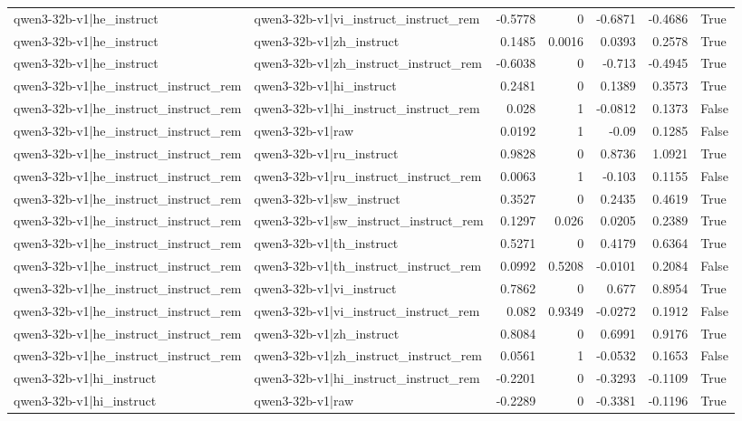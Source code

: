 \begin{table}
\begin{tabular}{l l r r r r l}
qwen3-32b-v1|he_instruct & qwen3-32b-v1|vi_instruct_instruct_rem & -0.5778 & 0 & -0.6871 & -0.4686 & True \\
qwen3-32b-v1|he_instruct & qwen3-32b-v1|zh_instruct & 0.1485 & 0.0016 & 0.0393 & 0.2578 & True \\
qwen3-32b-v1|he_instruct & qwen3-32b-v1|zh_instruct_instruct_rem & -0.6038 & 0 & -0.713 & -0.4945 & True \\
qwen3-32b-v1|he_instruct_instruct_rem & qwen3-32b-v1|hi_instruct & 0.2481 & 0 & 0.1389 & 0.3573 & True \\
qwen3-32b-v1|he_instruct_instruct_rem & qwen3-32b-v1|hi_instruct_instruct_rem & 0.028 & 1 & -0.0812 & 0.1373 & False \\
qwen3-32b-v1|he_instruct_instruct_rem & qwen3-32b-v1|raw & 0.0192 & 1 & -0.09 & 0.1285 & False \\
qwen3-32b-v1|he_instruct_instruct_rem & qwen3-32b-v1|ru_instruct & 0.9828 & 0 & 0.8736 & 1.0921 & True \\
qwen3-32b-v1|he_instruct_instruct_rem & qwen3-32b-v1|ru_instruct_instruct_rem & 0.0063 & 1 & -0.103 & 0.1155 & False \\
qwen3-32b-v1|he_instruct_instruct_rem & qwen3-32b-v1|sw_instruct & 0.3527 & 0 & 0.2435 & 0.4619 & True \\
qwen3-32b-v1|he_instruct_instruct_rem & qwen3-32b-v1|sw_instruct_instruct_rem & 0.1297 & 0.026 & 0.0205 & 0.2389 & True \\
qwen3-32b-v1|he_instruct_instruct_rem & qwen3-32b-v1|th_instruct & 0.5271 & 0 & 0.4179 & 0.6364 & True \\
qwen3-32b-v1|he_instruct_instruct_rem & qwen3-32b-v1|th_instruct_instruct_rem & 0.0992 & 0.5208 & -0.0101 & 0.2084 & False \\
qwen3-32b-v1|he_instruct_instruct_rem & qwen3-32b-v1|vi_instruct & 0.7862 & 0 & 0.677 & 0.8954 & True \\
qwen3-32b-v1|he_instruct_instruct_rem & qwen3-32b-v1|vi_instruct_instruct_rem & 0.082 & 0.9349 & -0.0272 & 0.1912 & False \\
qwen3-32b-v1|he_instruct_instruct_rem & qwen3-32b-v1|zh_instruct & 0.8084 & 0 & 0.6991 & 0.9176 & True \\
qwen3-32b-v1|he_instruct_instruct_rem & qwen3-32b-v1|zh_instruct_instruct_rem & 0.0561 & 1 & -0.0532 & 0.1653 & False \\
qwen3-32b-v1|hi_instruct & qwen3-32b-v1|hi_instruct_instruct_rem & -0.2201 & 0 & -0.3293 & -0.1109 & True \\
qwen3-32b-v1|hi_instruct & qwen3-32b-v1|raw & -0.2289 & 0 & -0.3381 & -0.1196 & True \\

\end{tabular}
\end{table}
